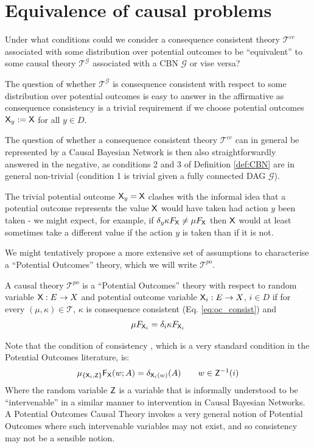 \section{Equivalence of causal problems}

Under what conditions could we consider a consequence consistent theory $\mathscr{T}^{cc}$ associated with some distribution over potential outcomes to be ``equivalent'' to some causal theory $\mathscr{T}^{\mathcal{G}}$ associated with a CBN $\mathcal{G}$ or vise versa? 

The question of whether $\mathscr{T}^{\mathcal{G}}$ is consequence consistent with respect to some distribution over potential outcomes is easy to answer in the affirmative as consequence consistency is a trivial requirement if we choose potential outcomes $\mathsf{X}_y:=\mathsf{X}$ for all $y\in D$.

The question of whether a consequence consistent theory $\mathscr{T}^{cc}$ can in general be represented by a Causal Bayesian Network is then also straightforwardly answered in the negative, as conditions 2 and 3 of Definition \ref{def:CBN} are in general non-trivial (condition 1 is trivial given a fully connected DAG $\mathcal{G}$).

The trivial potential outcome $\mathsf{X}_y=\mathsf{X}$ clashes with the informal idea that a potential outcome represents the value $\mathsf{X}$ would have taken had action $y$ been taken - we might expect, for example, if $\delta_y\kappa F_{\mathsf{X}}\neq \mu F_{\mathsf{X}}$ then $\mathsf{X}$ would at least sometimes take a different value if the action $y$ is taken than if it is not. 

We might tentatively propose a more extensive set of assumptions to characterise a ``Potential Outcomes'' theory, which we will write $\mathscr{T}^{po}$.

\begin{definition}
A causal theory $\mathscr{T}^{po}$ is a ``Potential Outcomes'' theory with respect to random variable $\mathsf{X}:E\to X$ and potential outcome variable $\mathsf{X}_i:E\to X$, $i\in D$ if for every $(\mu,\kappa)\in \mathscr{T}$, $\kappa$ is consequence consistent (Eq. \ref{eq:oc_consist}) and 
\begin{align}
    \mu F_{\mathsf{X}_i} = \delta_i\kappa F_{\mathsf{X}_i}
\end{align}
\end{definition}

Note that the condition of consistency \citep{richardson2013single}, which is a very standard condition in the Potential Outcomes literature, is:
\begin{align}
    \mu_{\{\mathsf{X}_i,\mathsf{Z}\}} \mathsf{F}_{\mathsf{X}} (w;A) = \delta_{\mathsf{X}_i(w)} (A) \qquad w\in \mathsf{Z}^{-1}(i)
\end{align}
Where the random variable $\mathsf{Z}$ is a variable that is informally understood to be ``intervenable'' in a similar manner to intervention in Causal Bayesian Networks. A Potential Outcomes Causal Theory invokes a very general notion of Potential Outcomes where such intervenable variables may not exist, and so consistency may not be a sensible notion.

